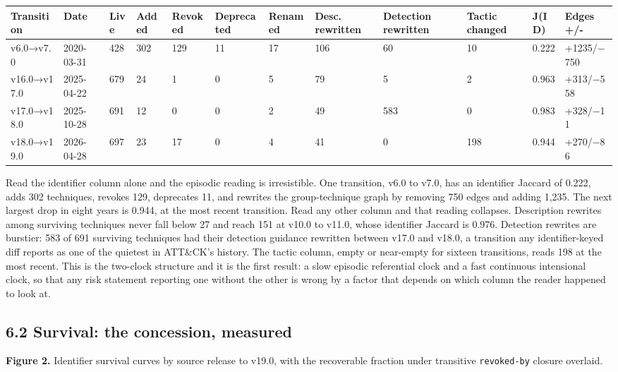 \documentclass[11pt,a4paper]{article}
\begin{document}
\begin{center}\footnotesize
\begin{tabular}{llllllllllll}
\toprule
Transition & Date & Live & Added & Revoked & Deprecated & Renamed & Desc. rewritten & Detection rewritten & Tactic changed & J(ID) & Edges +/- \\
\midrule
v6.0→v7.0 & 2020-03-31 & 428 & 302 & 129 & 11 & 17 & 106 & 60 & 10 & 0.222 & +1235/−750 \\
v16.0→v17.0 & 2025-04-22 & 679 & 24 & 1 & 0 & 5 & 79 & 5 & 2 & 0.963 & +313/−558 \\
v17.0→v18.0 & 2025-10-28 & 691 & 12 & 0 & 0 & 2 & 49 & 583 & 0 & 0.983 & +328/−11 \\
v18.0→v19.0 & 2026-04-28 & 697 & 23 & 17 & 0 & 4 & 41 & 0 & 198 & 0.944 & +270/−86 \\
\bottomrule
\end{tabular}
\end{center}

Read the identifier column alone and the episodic reading is irresistible. One transition, v6.0 to v7.0, has an identifier Jaccard of 0.222, adds 302 techniques, revokes 129, deprecates 11, and rewrites the group-technique graph by removing 750 edges and adding 1,235. The next largest drop in eight years is 0.944, at the most recent transition. Read any other column and that reading collapses. Description rewrites among surviving techniques never fall below 27 and reach 151 at v10.0 to v11.0, whose identifier Jaccard is 0.976. Detection rewrites are burstier: 583 of 691 surviving techniques had their detection guidance rewritten between v17.0 and v18.0, a transition any identifier-keyed diff reports as one of the quietest in ATT\&CK's history. The tactic column, empty or near-empty for sixteen transitions, reads 198 at the most recent. This is the two-clock structure and it is the first result: a slow episodic referential clock and a fast continuous intensional clock, so that any risk statement reporting one without the other is wrong by a factor that depends on which column the reader happened to look at.

\subsection{6.2 Survival: the concession, measured}

\textbf{Figure 2.} Identifier survival curves by source release to v19.0, with the recoverable fraction under transitive \texttt{revoked-by} closure overlaid.
\end{document}
